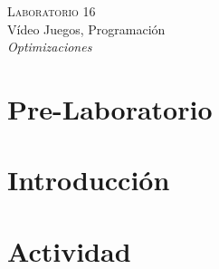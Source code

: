 \begin{center}
\textsc{\Large Laboratorio 16}~\\
{\large Vídeo Juegos, Programación}~\\
\emph{Optimizaciones}
\end{center}

\section{Pre-Laboratorio}

\section{Introducción}


\section{Actividad}
